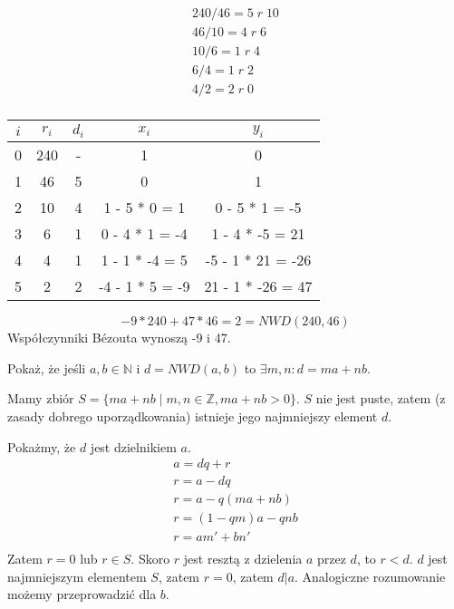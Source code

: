 \documentclass[main.tex]{subfiles}
\begin{document}
    \begin{gather*}
        240 / 46 = 5 \;r\; 10\\
        46 / 10 = 4 \;r\; 6\\
        10 / 6 = 1 \;r\; 4\\
        6 / 4 = 1 \;r\; 2\\
        4 / 2 = 2 \;r\; 0\\
    \end{gather*}

    \begin{table}[H]
        \centering
        \begin{tabular}{|c|c|c|c|c|}
            \hline
            $i$ &  $r_i$& $d_i$ &       $x_i$   &       $y_i$       \\
            \hline
            0 & 240 & - & 1 & 0           \\
            \hline
            1 & 46 & 5 & 0 & 1           \\
            \hline
            2 & 10 & 4 & 1 - 5 * 0 = 1 & 0 - 5 * 1 = -5    \\
            \hline
            3 & 6 & 1 & 0 - 4 * 1 = -4& 1 - 4 * -5 = 21   \\
            \hline
            4 & 4 & 1 & 1 - 1 * -4 = 5& -5 - 1 * 21 = -26 \\
            \hline
            5 & 2 & 2 &-4 - 1 * 5 = -9& 21 - 1 * -26 = 47 \\
            \hline

        \end{tabular}
    \end{table}

    \[-9 * 240 + 47 * 46 = 2 = NWD(240, 46)\]
    Współczynniki Bézouta wynoszą -9 i 47.\\

    \begin{exercise}
        Pokaż, że jeśli $a, b \in \mathbb{N}$ i $d = NWD(a, b)$ to $\exists m, n : d = ma + nb$.
    \end{exercise}

    Mamy zbiór $S = \{ma + nb \; | \; m, n \in \mathbb{Z}, ma + nb > 0\}$. $S$ nie jest puste, zatem (z zasady dobrego uporządkowania) istnieje jego najmniejszy element $d$.

    Pokażmy, że $d$ jest dzielnikiem $a$.
    \begin{gather*}
        a = dq + r\\
        r = a - dq\\
        r = a - q(ma + nb)\\
        r = (1 - qm)a - qnb\\
        r = am' + bn'\\
    \end{gather*}
    Zatem $r = 0$ lub $r \in S$. Skoro $r$ jest resztą z dzielenia $a$ przez $d$, to $r < d$. $d$ jest najmniejszym elementem $S$, zatem $r = 0$, zatem $d | a$. Analogiczne rozumowanie możemy przeprowadzić dla $b$.
\end{document}

